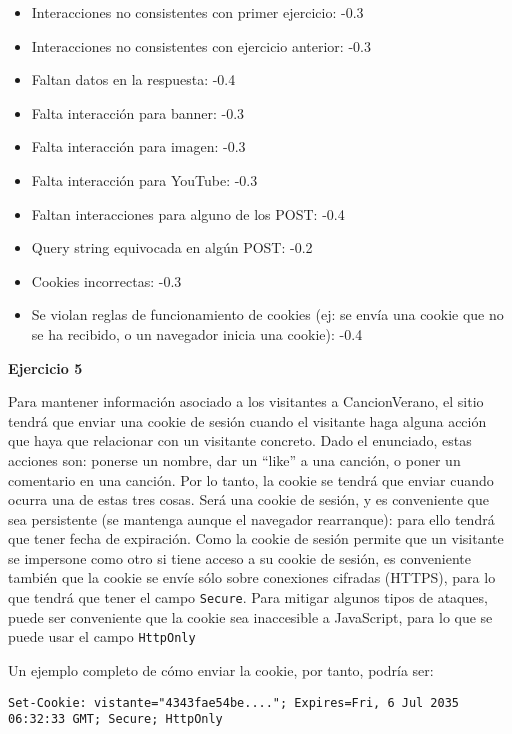 \begin{itemize}
\item Interacciones no consistentes con primer ejercicio: -0.3
\item Interacciones no consistentes con ejercicio anterior: -0.3
\item Faltan datos en la respuesta: -0.4
\item Falta interacción para banner: -0.3
\item Falta interacción para imagen: -0.3
\item Falta interacción para YouTube: -0.3
\item Faltan interacciones para alguno de los POST: -0.4
\item Query string equivocada en algún POST: -0.2
\item Cookies incorrectas: -0.3
\item Se violan reglas de funcionamiento de cookies (ej: se envía una cookie que no se ha recibido, o un navegador inicia una cookie): -0.4
\end{itemize}




\textbf{Ejercicio 5}

Para mantener información asociado a los visitantes a CancionVerano, el sitio tendrá que enviar una cookie de sesión cuando el visitante haga alguna acción que haya que relacionar con un visitante concreto. Dado el enunciado, estas acciones son: ponerse un nombre, dar un ``like'' a una canción, o poner un comentario en una canción. Por lo tanto, la cookie se tendrá que enviar cuando ocurra una de estas tres cosas. Será una cookie de sesión, y es conveniente que sea persistente (se mantenga aunque el navegador rearranque): para ello tendrá que tener fecha de expiración. Como la cookie de sesión permite que un visitante se impersone como otro si tiene acceso a su cookie de sesión, es conveniente también que la cookie se envíe sólo sobre conexiones cifradas (HTTPS), para lo que tendrá que tener el campo \texttt{Secure}. Para mitigar algunos tipos de ataques, puede ser conveniente que la cookie sea inaccesible a JavaScript, para lo que se puede usar el campo \texttt{HttpOnly}

Un ejemplo completo de cómo enviar la cookie, por tanto, podría ser:

\begin{verbatim}
Set-Cookie: vistante="4343fae54be...."; Expires=Fri, 6 Jul 2035 06:32:33 GMT; Secure; HttpOnly
\end{verbatim}

